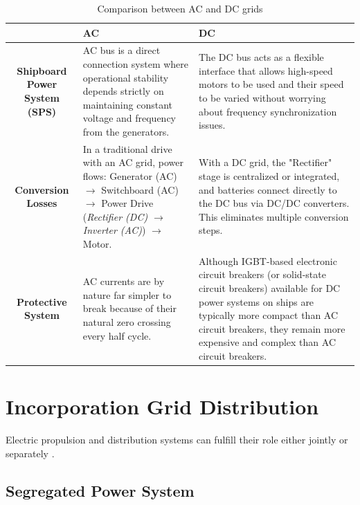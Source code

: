 \begin{table}[H]
	\centering
	\caption{Comparison between AC and DC grids \cite{Xu2022} \cite{ABB}}
	\label{tab:AC_DC_Grid}
	\begin{tabular}{|c|p{50mm}|p{50mm}|}
		\hline      
		&\textbf{AC}&\textbf{DC}\\		
\hline \hline
		\textbf{Shipboard Power System (SPS)}
		& AC bus is a direct connection system where operational stability depends strictly on maintaining constant voltage and frequency from the generators.
		
		& The DC bus acts as a flexible interface that allows high-speed motors to be used and their speed to be varied without worrying about frequency synchronization issues.		
\\
\hline
		\textbf{Conversion Losses}
		& In a traditional drive with an AC grid, power flows: Generator (AC) $\to$ Switchboard (AC) $\to$ Power Drive (\textit{Rectifier (DC) $\to$ Inverter (AC)}) $\to$ Motor. 
		 & With a DC grid, the "Rectifier" stage is centralized or integrated, and batteries connect directly to the DC bus via DC/DC converters. This eliminates multiple conversion steps.
\\
\hline
		\textbf{Protective System}
		& AC currents are by nature far simpler to break because of their natural zero crossing every half cycle.
		 & Although IGBT-based electronic circuit breakers (or solid-state circuit breakers) available for DC power systems on ships are typically more compact than AC circuit breakers, they remain more expensive and complex than AC circuit breakers.
		 
\\
		
\hline \hline
	\end{tabular}
\end{table}



\section{Incorporation Grid Distribution}

Electric propulsion and distribution systems can fulfill their role either jointly or separately \cite{Reusser} \cite{SKSul}. 

\subsection{Segregated Power System}

